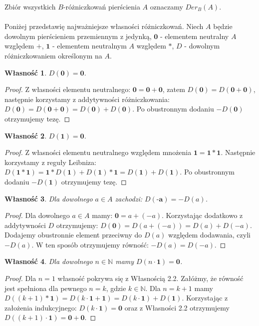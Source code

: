 \documentclass[12pt,a4paper]{article}
\newtheorem{wl}{Własność}[section]
\numberwithin{equation}{section}
\begin{document}
Zbiór wszystkich $B$-różniczkowań pierścienia $A$ oznaczamy $Der_{B}(A)$.
\\\\ \indent
Poniżej przedstawię najważniejsze własności różniczkowań. Niech $A$ będzie dowolnym pierścieniem przemiennym z jedynką, $\textbf{0}$ - elementem neutralny $A$ względem $+$, $\textbf{1}$ - elementem neutralnym $A$ względem $*$, $D$ - dowolnym różniczkowaniem określonym na $A$.
\begin{wl}
$D(\textbf{0})=\textbf{0}$.
\end{wl}
\begin{proof}
 Z własności elementu neutralnego: $\textbf{0}=\textbf{0}+\textbf{0}$, zatem
$D(\textbf{0})=D(\textbf{0}+\textbf{0})$, następnie korzystamy z addytywności różniczkowania: $D(\textbf{0})=D(\textbf{0}+\textbf{0})=D(\textbf{0})+D(\textbf{0})$. Po obustronnym dodaniu $-D(\textbf{0})$ otrzymujemy tezę.
\end{proof}
\begin{wl}
$D(\textbf{1})=\textbf{0}$.
\end{wl}
\begin{proof}Z własności elementu neutralnego względem mnożenia $\textbf{1}=\textbf{1}*\textbf{1}$. Następnie korzystamy z reguły Leibniza: $D(\textbf{1}*\textbf{1})=\textbf{1}*D(\textbf{1})+D(\textbf{1})*\textbf{1}=D(\textbf{1})+D(\textbf{1})$. Po obustronnym dodaniu $-D(\textbf{1})$ otrzymujemy tezę.
\end{proof}
\begin{wl}
Dla dowolnego $a \in A$ zachodzi: $D(\textbf{-a})=-D(a)$.
\end{wl}
\begin{proof}
Dla dowolnego $a \in A$ mamy: $\textbf{0}=a+(-a)$. Korzystając dodatkowo z addytywności $D$ otrzymujemy: 
$D(\textbf{0})=D(a+(-a))=D(a)+D(-a)$. Dodajemy obustronnie element przeciwny do $D(a)$ względem dodawania, czyli $-D(a)$. W ten sposób otrzymujemy równość: $-D(a)=D(-a)$.
\end{proof}
\begin{wl}
Dla dowolnego $n \in \mathbb{N}$ mamy $D(n \cdot \textbf{1})=\textbf{0}$. 
\end{wl}
\begin{proof}
Dla $n=1$ własność pokrywa się z Własnością 2.2. Załóżmy, że równość jest spełniona dla pewnego $n=k$, gdzie $k \in \mathbb{N}$. Dla $n=k+1$ mamy 
$D((k+1)*\textbf{1})=D(k \cdot \textbf{1}+\textbf{1})=D(k \cdot \textbf{1})+D(\textbf{1})$. Korzystając z założenia indukcyjnego: $D(k \cdot \textbf{1})=\textbf{0}$ oraz z Własności 2.2 otrzymujemy  
$D((k+1) \cdot \textbf{1})=\textbf{0}+\textbf{0}$.
\end{proof}
\end{document}

